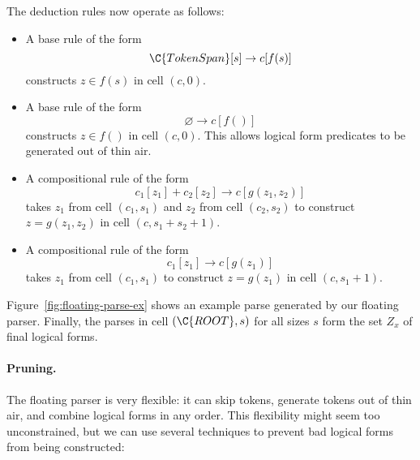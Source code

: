 The deduction rules now operate as follows:
\begin{itemize}
\item A base rule of the form
\begin{equation*}
\C{TokenSpan}[s] \to c[f(s)]
\end{equation*}
constructs $z \in f(s)$ in cell $(c, 0)$.
\item A base rule of the form
\begin{equation*}
\varnothing \to c[f()]
\end{equation*}
constructs $z \in f()$ in cell $(c,0)$.
This allows logical form predicates to be generated
out of thin air.
\item A compositional rule of the form
\begin{equation*}
c_1[z_1] + c_2[z_2] \to c[g(z_1, z_2)]
\label{eqn:rule-c2-again}
\end{equation*}
takes $z_1$ from cell $(c_1, s_1)$ and
$z_2$ from cell $(c_2, s_2)$
to construct $z = g(z_1, z_2)$
in cell $(c, s_1 + s_2 + 1)$.
\item A compositional rule of the form
\begin{equation*}
c_1[z_1] \to c[g(z_1)]
\end{equation*}
takes $z_1$ from cell $(c_1, s_1)$ 
to construct $z = g(z_1)$ in cell $(c, s_1 + 1)$.
\end{itemize}

Figure~\ref{fig:floating-parse-ex} shows
an example parse generated by our floating parser.
Finally,
the parses in cell $(\C{ROOT}, s)$ for all sizes $s$
form the set $Z_x$ of final logical forms.

\paragraph{Pruning.}

The floating parser is very flexible:
it can skip tokens,
generate tokens out of thin air,
and combine logical forms in any order.
This flexibility might seem too unconstrained,
but we can use several techniques to prevent
bad logical forms from being constructed:

